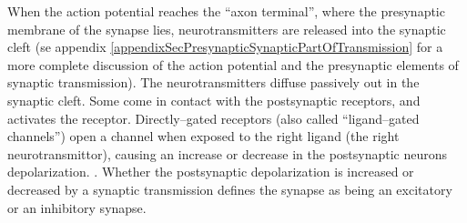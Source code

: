 
When the action potential reaches the ``axon terminal'', where the presynaptic membrane of the synapse lies, neurotransmitters are released into the synaptic cleft 
 	(se appendix \ref{appendixSecPresynapticSynapticPartOfTransmission} for a more complete discussion of the action potential and the presynaptic elements of synaptic transmission).
The neurotransmitters diffuse passively out in the synaptic cleft. Some come in contact with the postsynaptic receptors, and activates the receptor.
Directly--gated receptors (also called ``ligand--gated channels'') open a channel when exposed to the right ligand (the right neurotransmittor), 
	causing an increase or decrease in the postsynaptic neurons depolarization\cite{PrinciplesOfNeuralScience4edKAP10}. .
Whether the postsynaptic depolarization is increased or decreased by a synaptic transmission defines the synapse as being an excitatory or an inhibitory synapse\cite{PurvesNeuroscienceKAP05}.




